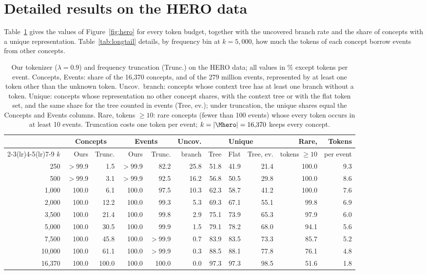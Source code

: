 \section{Detailed results on the HERO data}
\label{app:hero}

Table~\ref{tab:ehr} gives the values of Figure~\ref{fig:hero} for every token budget, together with the uncovered branch rate and the share of concepts with a unique representation.
Table~\ref{tab:longtail} details, by frequency bin at $k = 5{,}000$, how much the tokens of each concept borrow events from other concepts.

\begin{table}[t]
\centering
\small
\setlength{\tabcolsep}{3.5pt}
\begin{tabular}{@{}r rr rr r rrr r r@{}}
\toprule
 & \multicolumn{2}{c}{Concepts} & \multicolumn{2}{c}{Events} & Uncov. & \multicolumn{3}{c}{Unique} & Rare, & Tokens \\
\cmidrule(lr){2-3}\cmidrule(lr){4-5}\cmidrule(lr){7-9}
$k$ & Ours & Trunc. & Ours & Trunc. & branch & Tree & Flat & Tree, ev. & tokens $\ge 10$ & per event \\
\midrule
250 & $>$99.9 & 1.5 & $>$99.9 & 82.2 & 25.8 & 51.8 & 41.9 & 21.4 & 100.0 & 9.3 \\
500 & $>$99.9 & 3.1 & $>$99.9 & 92.5 & 16.2 & 56.8 & 50.5 & 29.8 & 100.0 & 8.6 \\
1,000 & 100.0 & 6.1 & 100.0 & 97.5 & 10.3 & 62.3 & 58.7 & 41.2 & 100.0 & 7.6 \\
2,000 & 100.0 & 12.2 & 100.0 & 99.3 & 5.3 & 69.3 & 67.1 & 55.1 & 99.8 & 6.9 \\
3,500 & 100.0 & 21.4 & 100.0 & 99.8 & 2.9 & 75.1 & 73.9 & 65.3 & 97.9 & 6.0 \\
5,000 & 100.0 & 30.5 & 100.0 & 99.9 & 1.5 & 79.1 & 78.2 & 68.0 & 94.1 & 5.6 \\
7,500 & 100.0 & 45.8 & 100.0 & $>$99.9 & 0.7 & 83.9 & 83.5 & 73.3 & 85.7 & 5.2 \\
10,000 & 100.0 & 61.1 & 100.0 & $>$99.9 & 0.3 & 88.5 & 88.1 & 77.8 & 76.1 & 4.8 \\
16,370 & 100.0 & 100.0 & 100.0 & 100.0 & 0.0 & 97.3 & 97.3 & 98.5 & 51.6 & 1.8 \\
\bottomrule
\end{tabular}
\caption{Our tokenizer ($\lambda = 0.9$) and frequency truncation (Trunc.) on the HERO data; all values in \% except tokens per event.
Concepts, Events: share of the 16,370 concepts, and of the 279 million events, represented by at least one token other than the unknown token.
Uncov.\ branch: concepts whose context tree has at least one branch without a token.
Unique: concepts whose representation no other concept shares, with the context tree or with the flat token set, and the same share for the tree counted in events (Tree, ev.); under truncation, the unique shares equal the Concepts and Events columns.
Rare, tokens $\ge 10$: rare concepts (fewer than 100 events) whose every token occurs in at least 10 events.
Truncation costs one token per event; $k = |\Mhero| = 16{,}370$ keeps every concept.}
\label{tab:ehr}
\end{table}


